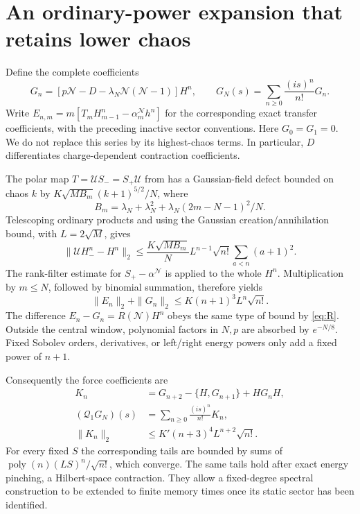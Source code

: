 \documentclass[11pt]{article}
\newcommand{\NN}{\mathcal N}
\newcommand{\QQ}{\mathcal Q}
\begin{document}
\newpage
\section{An ordinary-power expansion that retains lower chaos}
Define the complete coefficients
\begin{equation}
 G_n=[p\NN-D-\lambda_N\NN(\NN-1)]H^n,\qquad
 G_N(s)=\sum_{n\ge0}\frac{(is)^n}{n!}G_n.\label{eq:rawseries}
\end{equation}
Write $E_{n,m}=m[T_mH_{m-1}^n-\alpha_m^{\NN}h^n]$ for the
corresponding exact transfer coefficients, with the preceding inactive
sector conventions. Here $G_0=G_1=0$. We do not replace this series by its highest-chaos
terms. In particular, $D$ differentiates charge-dependent contraction
coefficients.

The polar map $T=\mathcal U S_-=S_+\mathcal U$ from \cite{Transfer}
has a Gaussian-field defect bounded on chaos $k$ by
$K\sqrt{MB_m}(k+1)^{5/2}/N$, where
\begin{equation}
 B_m=\lambda_N+\lambda_N^2+
        \lambda_N(2m-N-1)^2/N.
\end{equation}
Telescoping ordinary products and using the Gaussian creation/annihilation
bound, with $L=2\sqrt M$, gives
\begin{equation}
 \|\mathcal U H_-^n-H^n\|_2
 \le\frac{K\sqrt{MB_m}}N L^{n-1}\sqrt{n!}
       \sum_{a<n}(a+1)^2.\label{eq:polar}
\end{equation}
The rank-filter estimate for $S_+-\alpha^{\NN}$ is applied to the
whole $H^n$. Multiplication by $m\le N$, followed by binomial summation,
therefore yields
\begin{equation}
 \|E_n\|_2+\|G_n\|_2\le K(n+1)^3L^n\sqrt{n!}.\label{eq:tail}
\end{equation}
The difference $E_n-G_n=R(\NN)H^n$ obeys the same type of bound by
\eqref{eq:R}. Outside the central window, polynomial factors in $N,p$
are absorbed by $e^{-N/8}$. Fixed Sobolev orders, derivatives, or
left/right energy powers only add a fixed power of $n+1$.

Consequently the force coefficients are
\begin{align}
 K_n&=G_{n+2}-\{H,G_{n+1}\}+HG_nH,\\
 (\QQ_1G_N)(s)&=\sum_{n\ge0}\frac{(is)^n}{n!}K_n,\\
 \|K_n\|_2&\le K'(n+3)^4L^{n+2}\sqrt{n!}.\label{eq:forcetail}
\end{align}
For every fixed $S$ the corresponding tails are bounded by sums of
$\operatorname{poly}(n)(LS)^n/\sqrt{n!}$, which converge. The same
tails hold after exact energy pinching, a Hilbert-space contraction.
They allow a fixed-degree spectral construction to be extended to
finite memory times once its static sector has been identified.
\end{document}
